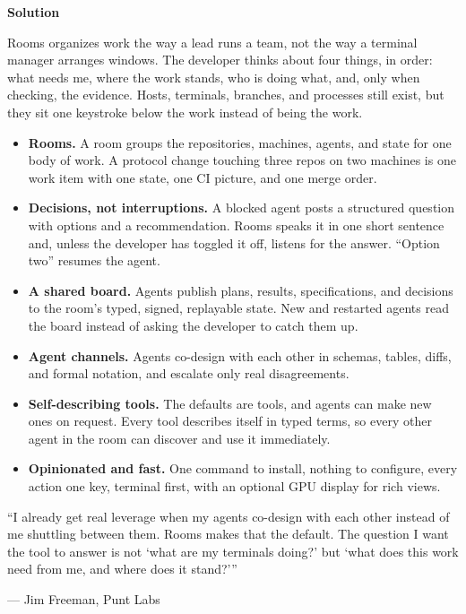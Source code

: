 \documentclass[11pt,letterpaper]{article}
\newcommand{\product}{Rooms}
\newcommand{\prsection}[1]{%
  \vspace{1em}%
  {\large\bfseries\color{SectionBlue}#1}%
  \vspace{0.3em}\par%
}
\begin{document}
\prsection{Solution}

\product{} organizes work the way a lead runs a team, not the way a terminal
manager arranges windows. The developer thinks about four things, in order:
what needs me, where the work stands, who is doing what, and, only when
checking, the evidence. Hosts, terminals, branches, and processes still exist,
but they sit one keystroke below the work instead of being the work.

\begin{itemize}[leftmargin=1.5em, itemsep=0.3em]
  \item \textbf{Rooms.} A room groups the repositories, machines, agents, and
    state for one body of work. A protocol change touching three repos on two
    machines is one work item with one state, one CI picture, and one merge
    order.
  \item \textbf{Decisions, not interruptions.} A blocked agent posts a
    structured question with options and a recommendation. \product{} speaks
    it in one short sentence and, unless the developer has toggled it off,
    listens for the answer. ``Option two'' resumes the agent.
  \item \textbf{A shared board.} Agents publish plans, results, specifications,
    and decisions to the room's typed, signed, replayable state. New and
    restarted agents read the board instead of asking the developer to catch
    them up.
  \item \textbf{Agent channels.} Agents co-design with each other in schemas,
    tables, diffs, and formal notation, and escalate only real disagreements.
  \item \textbf{Self-describing tools.} The defaults are tools, and agents can
    make new ones on request. Every tool describes itself in typed terms, so
    every other agent in the room can discover and use it immediately.
  \item \textbf{Opinionated and fast.} One command to install, nothing to
    configure, every action one key, terminal first, with an optional GPU
    display for rich views.
\end{itemize}

\begin{spokespersonquote}
``I already get real leverage when my agents co-design with each other instead
of me shuttling between them. \product{} makes that the default. The question
I want the tool to answer is not `what are my terminals doing?' but `what does
this work need from me, and where does it stand?'''
\par\vspace{0.3em}\hfill--- Jim Freeman, Punt Labs
\end{spokespersonquote}
\end{document}

